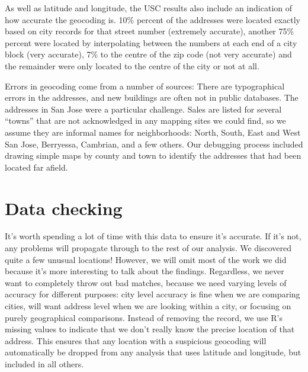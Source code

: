 \documentclass[oneside]{article}
\begin{document}
As well as latitude and longitude, the USC results also include an indication of how accurate the geocoding is.  10\%  percent of the addresses were located exactly based on city records for that street number (extremely accurate), another 75\% percent were located by interpolating between the numbers at each end of a city block (very accurate), 7\% to the centre of the zip code (not very accurate) and the remainder were only located to the centre of the city or not at all.  


Errors in geocoding come from a number of sources:  There are typographical errors in the addresses, and new buildings are often not in public databases.  The addresses in San Jose were a particular challenge.  Sales are listed for several ``towns'' that are not acknowledged in any mapping sites we could find, so we assume they are informal names for neighborhoods: North, South, East and West San Jose, Berryessa, Cambrian, and a few others.  Our debugging process included drawing simple maps by county and town to identify the addresses that had been located far afield.

\section{Data checking}

It's worth spending a lot of time with this data to ensure it's accurate.  If it's not, any problems will propagate through to the rest of our analysis.  We discovered quite a few unusual locations!  However, we will omit most of the work we did because it's more interesting to talk about the findings.  Regardless, we never want to completely throw out bad matches, because we need varying levels of accuracy for different purposes: city level accuracy is fine when we are comparing cities, will want address level when we are looking within a city, or focusing on purely geographical comparisons.  Instead of removing the record, we use R's missing values to indicate that we don't really know the precise location of that address.  This ensures that any location with a suspicious geocoding will automatically be dropped from any analysis that uses latitude and longitude, but included in all others.
\end{document}
